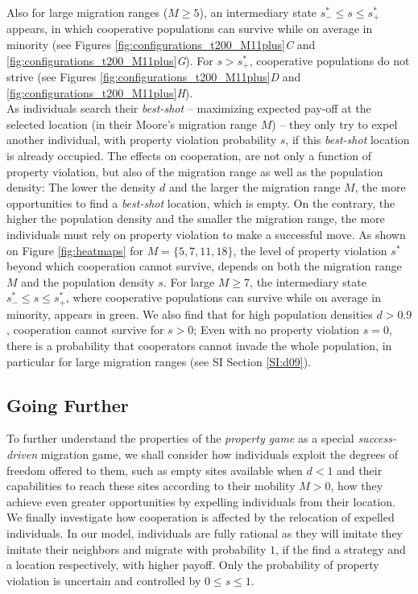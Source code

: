 Also for large migration ranges ($M \geqslant 5$), an intermediary state $s^{*}_{-} \leqslant s \leqslant s^{*}_{+}$ appears, in which cooperative populations can survive while on average in minority (see Figures \ref{fig:configurations_t200_M11plus}{\it C} and \ref{fig:configurations_t200_M11plus}{\it G}). For $s > s^{*}_{+}$, cooperative populations do not strive (see Figures \ref{fig:configurations_t200_M11plus}{\it D} and \ref{fig:configurations_t200_M11plus}{\it H}).\\

As individuals search their {\it best-shot} -- maximizing expected pay-off at the selected location (in their Moore's migration range $M$) -- they only try to expel another individual, with property violation probability $s$, if this {\it best-shot} location is already occupied. The effects on cooperation, are not only a function of property violation, but also of the migration range as well as the population density: The lower the density $d$ and the larger the migration range $M$, the more opportunities to find a {\it best-shot} location, which is empty. On the contrary, the higher the population density and the smaller the migration range, the more individuals must rely on property violation to make a successful move. As shown on Figure \ref{fig:heatmaps} for $M= \{ 5,7,11,18\}$, the level of property violation $s^{*}$ beyond which cooperation cannot survive, depends on both the migration range $M$ and the population density $s$. For large $M \geqslant  7$, the intermediary state $s^{*}_{-} \leqslant s \leqslant s^{*}_{+}$, where cooperative populations can survive while on average in minority, appears in green. We also find that for high population densities $d > 0.9$, cooperation cannot survive for $s > 0$; Even with no property violation $s=0$, there is a probability that cooperators cannot invade the whole population, in particular for large migration ranges (see SI Section \ref{SI:d09}).\\


\subsection*{Going Further}
To further understand the properties of the {\it property game} as a special {\it success-driven} migration game, we shall consider how individuals exploit the degrees of freedom offered to them, such as empty sites available when $d < 1$ and their capabilities to reach these sites according to their mobility $M > 0$, how they achieve even greater opportunities by expelling individuals from their location. We finally investigate how cooperation is affected by the relocation of expelled individuals. In our model, individuals are fully rational as they will imitate they imitate their neighbors and migrate with probability $1$, if the find a strategy and a location respectively, with higher payoff. Only the probability of property violation is uncertain and controlled by $0 \leqslant s \leqslant 1$. \\

